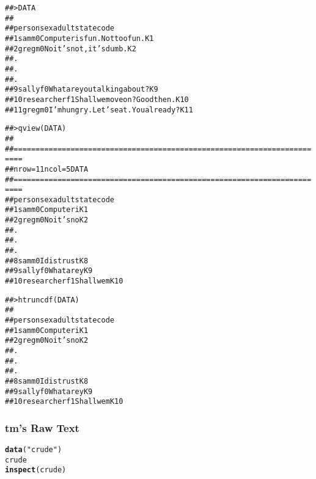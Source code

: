 \documentclass{article}\usepackage[]{graphicx}\usepackage[]{color}
\makeatletter
\newcommand{\hlstr}[1]{\textcolor[rgb]{0.192,0.494,0.8}{#1}}%
\newcommand{\hlstd}[1]{\textcolor[rgb]{0.345,0.345,0.345}{#1}}%
\newcommand{\hlkwd}[1]{\textcolor[rgb]{0.737,0.353,0.396}{\textbf{#1}}}%
\newenvironment{kframe}{%
 \def\at@end@of@kframe{}%
 \ifinner\ifhmode%
  \def\at@end@of@kframe{\end{minipage}}%
  \begin{minipage}{\columnwidth}%
 \fi\fi%
 \def\FrameCommand##1{\hskip\@totalleftmargin \hskip-\fboxsep
 \colorbox{shadecolor}{##1}\hskip-\fboxsep
     \hskip-\linewidth \hskip-\@totalleftmargin \hskip\columnwidth}%
 \MakeFramed {\advance\hsize-\width
   \@totalleftmargin\z@ \linewidth\hsize
   \@setminipage}}%
 {\par\unskip\endMakeFramed%
 \at@end@of@kframe}
\newenvironment{knitrout}{}{} %
\makeatother
\begin{document}
\begin{knitrout}
\color{fgcolor}\begin{kframe}
\begin{alltt}
## > DATA
##
##        person sex adult                                 state code
## 1         sam   m     0         Computer is fun. Not too fun.   K1
## 2        greg   m     0               No it's not, it's dumb.   K2
## .
## .
## .
## 9       sally   f     0           What are you talking about?   K9
## 10 researcher   f     1         Shall we move on?  Good then.  K10
## 11       greg   m     0 I'm hungry.  Let's eat.  You already?  K11


## > qview(DATA)
##
## ========================================================================
## nrow =  11           ncol =  5             DATA
## ========================================================================
##        person sex adult      state code
## 1         sam   m     0 Computer i   K1
## 2        greg   m     0 No it's no   K2
## .
## .
## .
## 8         sam   m     0 I distrust   K8
## 9       sally   f     0 What are y   K9
## 10 researcher   f     1 Shall we m  K10

## > htruncdf(DATA)
##
##        person sex adult      state code
## 1         sam   m     0 Computer i   K1
## 2        greg   m     0 No it's no   K2
## .
## .
## .
## 8         sam   m     0 I distrust   K8
## 9       sally   f     0 What are y   K9
## 10 researcher   f     1 Shall we m  K10
\end{alltt}
\end{kframe}
\end{knitrout}

\subsubsection{tm's Raw Text}
\begin{knitrout}
\color{fgcolor}\begin{kframe}
\begin{alltt}
\hlkwd{data}\hlstd{(}\hlstr{"crude"}\hlstd{)}
\hlstd{crude}
\hlkwd{inspect}\hlstd{(crude)}
\end{alltt}
\end{kframe}
\end{knitrout}
\end{document}
